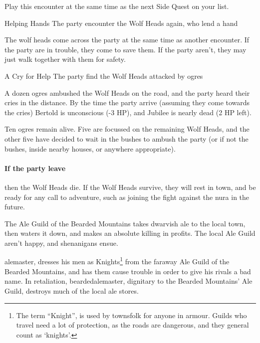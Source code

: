\begin{multicols}{2}
Play this encounter at the same time as the next Side Quest on your list.

{Helping Hands}%
{The party encounter the Wolf Heads again, who lend a hand}%

The wolf heads come across the party at the same time as another encounter.
If the party are in trouble, they come to save them.
If the party aren't, they may just walk together with them for safety.

{\N A Cry for Help}%
{The party find the Wolf Heads attacked by ogres}%

A dozen ogres ambushed the Wolf Heads on the road, and the party heard their cries in the distance.
By the time the party arrive (assuming they come towards the cries) Bertold is unconscious (-3 HP), and Jubilee is nearly dead (2 HP left).

Ten ogres remain alive.
Five are focussed on the remaining Wolf Heads, and the other five have decided to wait in the bushes to ambush the party (or if not the bushes, inside nearby houses, or anywhere appropriate).

\paragraph{If the party leave}
then the Wolf Heads die.
If the Wolf Heads survive, they will rest in town, and be ready for any call to adventure, such as joining the fight against the nura in the future.



\stopcontents[sq]


\startcontents[sq]

\sqminitoc

\noindent
The Ale Guild of the Bearded Mountains takes dwarvish ale to the local town, then waters it down, and makes an absolute killing in profits.
The local Ale Guild aren't happy, and shenanigans ensue.

\Gls{alemaster}, dresses his men as Knights\footnote{The term ``Knight'', is used by townsfolk for anyone in armour.
Guilds who travel need a lot of protection, as the roads are dangerous, and they general count as `knights'.}
from the faraway Ale Guild of the Bearded Mountains, and has them cause trouble in order to give his rivals a bad name.
In retaliation, \gls{beardedalemaster}, dignitary to the Bearded Mountains' Ale Guild, destroys much of the local ale stores.


\end{multicols}
